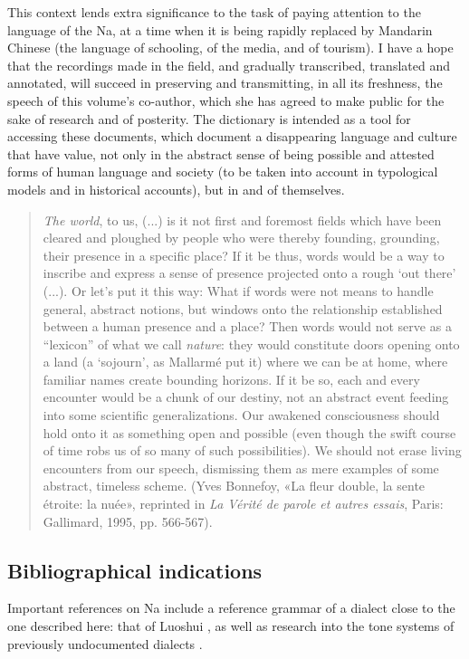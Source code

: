 This context lends extra significance to the task of paying attention to the language of the Na, at a time when it is being rapidly replaced by Mandarin Chinese (the language of schooling, of the media, and of tourism). I have a hope that the recordings made in the field, and gradually transcribed, translated and annotated, will succeed in preserving and transmitting, in all its freshness, the speech of this volume's co-author, which she has agreed to make public for the sake of research and of posterity. The dictionary is intended as a tool for accessing these documents, which document a disappearing language and culture that have value, not only in the abstract sense of being possible and attested forms of human language and society (to be taken into account in typological models and in historical accounts), but in and of themselves.

	\begin{quote}
    \emph{The world}, to us, (...) is it not first and foremost fields which have been cleared and ploughed by people who were thereby founding, grounding, their presence in a specific place? If it be thus, words would be a way to inscribe and express a sense of presence projected onto a rough `out there' (...). Or let's put it this way: What if words were not means to handle general, abstract notions, but windows onto the relationship established between a human presence and a place? Then words would not serve as a ``lexicon'' of what we call \emph{nature}: they would constitute doors opening onto a land (a `sojourn', as Mallarmé put it) where we can be at home, where familiar names create bounding horizons. If it be so, each and every encounter would be a chunk of our destiny, not an abstract event feeding into some scientific generalizations. Our awakened consciousness should hold onto it as something open and possible (even though the swift course of time robs us of so many of such possibilities). We should not erase living encounters from our speech, dismissing them as mere examples of some abstract, timeless scheme. (Yves Bonnefoy, «La fleur double, la sente étroite: la nuée», reprinted in \emph{La Vérité de parole et autres essais}, Paris: Gallimard, 1995, pp. 566-567).
\end{quote}

\subsection*{Bibliographical indications}

Important references on Na include a reference grammar of a dialect close to the one described here: that of Luoshui  \parencite{lidz2010}, as well as research into the tone systems of previously undocumented dialects \parencite{a2016,dobbsetal2016,fily_documentation_2022}.

